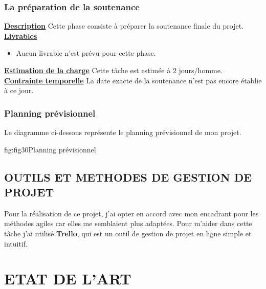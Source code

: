 \documentclass[overfullbox]{polytech/polytech}
\begin{document}
\subsection{La préparation de la soutenance}
\textbf{\underline{Description}}
\newline
\newline
Cette phase consiste à préparer la soutenance finale du projet.
\newline
\newline
\textbf{\underline{Livrables}}

\begin{itemize}
\item Aucun livrable n'est prévu pour cette phase.
\newline
\end{itemize}	

\textbf{\underline{Estimation de la charge}}
\newline
\newline
Cette tâche est estimée à 2 jours/homme. 
\newline
\newline
\textbf{\underline{Contrainte temporelle}}
\newline
\newline
La date exacte de la soutenance n'est pas encore établie à ce jour.

\subsection{Planning prévisionnel}
Le diagramme ci-dessous représente le planning prévisionnel de mon projet.
\begin{Figure}{fig:fig30}{Planning prévisionnel}
\end{Figure}

\section{OUTILS ET METHODES DE GESTION DE PROJET}
Pour la réalisation de ce projet, j'ai opter en accord avec mon encadrant pour les méthodes agiles car elles me semblaient plus adaptées. Pour m'aider dans cette tâche j'ai utilisé \textbf{Trello}, qui est un outil de gestion de projet en ligne simple et intuitif.



\chapter{ETAT DE L'ART}
\end{document}
